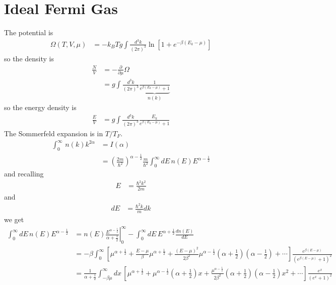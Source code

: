 \section{Ideal Fermi Gas}
The potential is
\begin{align}
    \Omega\left( T, V, \mu \right)
    &=
    -k _B T g
    \int \frac{d^3k}{\left( 2\pi \right)^3}
    \ln\left[ 
    1
    +
    e^{-\beta\left( E_k - \mu \right)}
    \right]
\end{align}
so the density is
\begin{align}
    \frac{N}{V}
    &=
    -\frac{\partial}{\partial \mu}
    \Omega\\
    &=
    g \int \frac{d^3k}{\left( 2\pi \right)^3}
    \underbrace{\frac{1}{e^{\beta\left( E_k - \mu \right)} + 1}}_{n(k)}
\end{align}
so the energy density is
\begin{align}
    \frac{E}{V} &=
    g \int \frac{d^3k}{\left( 2\pi \right)^3}
    \frac{E_k}{e^{\beta\left( E_k - \mu \right)} + 1}
\end{align}
The Sommerfeld expansion is in $T/T_F$.
\begin{align}
    \int_{0}^{\infty} \, n(k) k^{2\alpha}
    &= I(\alpha)\\
    &=
    \left( \frac{2m}{\hbar^2} \right)^{\alpha - \frac{1}{2}}
    \frac{m}{\hbar^2}
    \int_{0}^{\infty} dE\,
    n(E) E^{\alpha - \frac{1}{2}}
\end{align}
and recalling
\begin{align}
    E &=
    \frac{\hbar^2 k^2}{2m}
\end{align}
and
\begin{align}
    dE &=
    \frac{\hbar^2 k}{m}dk
\end{align}
we get
\begin{align}
    \int_{0}^{\infty} dE\, n(E)
    E^{\alpha - \frac{1}{2}}
    &=
    n(E)
    \left.
    \frac{E^{\alpha - \frac{1}{2}}}{\alpha + \frac{1}{2}}
    \right|_{0}^{\infty}
    -
    \int_{0}^{\infty} dE\,
    E^{\alpha + \frac{1}{2}}
    \frac{dn(E)}{dE}\\
    &=
    -\beta \int_{0}^{\infty}\left[ 
    \mu^{\alpha + \frac{1}{2}}
    +
    \frac{E - \mu}{\beta}
    \mu^{\alpha + \frac{1}{2}}
    +
    \frac{\left( E - \mu \right)^2}{2\beta^2}
    \mu^{\alpha - \frac{1}{2}}
    \left( \alpha + \frac{1}{2} \right)
    \left( \alpha - \frac{1}{2} \right)
    +
    \cdots
    \right]
    \frac{e^{\beta\left( E - \mu \right)}}{
    \left( e^{\beta\left( E - \mu \right)} + 1 \right)^2
    }\\
    &=
    \frac{1}{\alpha + \frac{1}{2}}
    \int_{-\beta \mu}^{\infty} dx\,
    \left[ 
    \mu^{\alpha + \frac{1}{2}}
    +
    \mu^{\alpha - \frac{1}{2}}
    \left( \alpha + \frac{1}{2} \right)
    x
    +
    \frac{\mu^{\alpha - \frac{1}{2}}}{2\beta^2}
    \left( \alpha + \frac{1}{2} \right)
    \left( \alpha - \frac{1}{2} \right)
    x^2
    +
    \cdots
    \right]
    \frac{e^{x}}{\left( e^x + 1 \right)^2}
\end{align}

